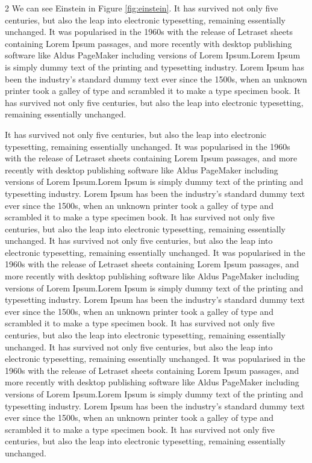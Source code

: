 \documentclass{article}
\begin{document}
\begin{multicols}{2}
    We can see Einstein in Figure \ref{fig:einstein}. It has survived not only five centuries, but also the leap into electronic typesetting, remaining essentially unchanged. It was popularised in the 1960s with the release of Letraset sheets containing Lorem Ipsum passages, and more recently with desktop publishing software like Aldus PageMaker including versions of Lorem Ipsum.Lorem Ipsum is simply dummy text of the printing and typesetting industry. Lorem Ipsum has been the industry's standard dummy text ever since the 1500s, when an unknown printer took a galley of type and scrambled it to make a type specimen book. It has survived not only five centuries, but also the leap into electronic typesetting, remaining essentially unchanged. 
        
    It has survived not only five centuries, but also the leap into electronic typesetting, remaining essentially unchanged. It was popularised in the 1960s with the release of Letraset sheets containing Lorem Ipsum passages, and more recently with desktop publishing software like Aldus PageMaker including versions of Lorem Ipsum.Lorem Ipsum is simply dummy text of the printing and typesetting industry. Lorem Ipsum has been the industry's standard dummy text ever since the 1500s, when an unknown printer took a galley of type and scrambled it to make a type specimen book. It has survived not only five centuries, but also the leap into electronic typesetting, remaining essentially unchanged. It has survived not only five centuries, but also the leap into electronic typesetting, remaining essentially unchanged. It was popularised in the 1960s with the release of Letraset sheets containing Lorem Ipsum passages, and more recently with desktop publishing software like Aldus PageMaker including versions of Lorem Ipsum.Lorem Ipsum is simply dummy text of the printing and typesetting industry. Lorem Ipsum has been the industry's standard dummy text ever since the 1500s, when an unknown printer took a galley of type and scrambled it to make a type specimen book. It has survived not only five centuries, but also the leap into electronic typesetting, remaining essentially unchanged. It has survived not only five centuries, but also the leap into electronic typesetting, remaining essentially unchanged. It was popularised in the 1960s with the release of Letraset sheets containing Lorem Ipsum passages, and more recently with desktop publishing software like Aldus PageMaker including versions of Lorem Ipsum.Lorem Ipsum is simply dummy text of the printing and typesetting industry. Lorem Ipsum has been the industry's standard dummy text ever since the 1500s, when an unknown printer took a galley of type and scrambled it to make a type specimen book. It has survived not only five centuries, but also the leap into electronic typesetting, remaining essentially unchanged. 


\end{multicols}
\end{document}
